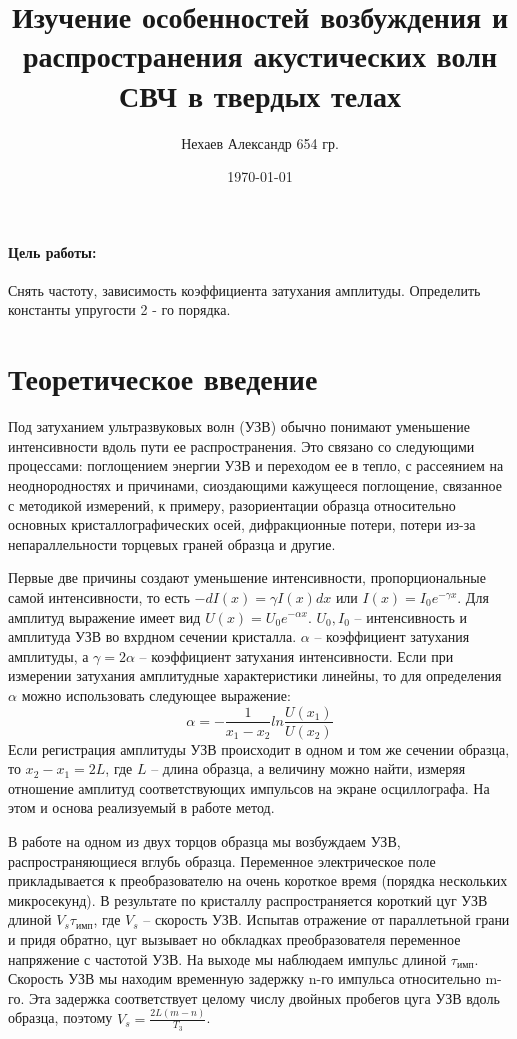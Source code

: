 \documentclass[a4paper, 12pt]{article}
\begin{document}
	\title{Изучение особенностей возбуждения и распространения акустических волн СВЧ в твердых телах}
	\author{Нехаев Александр 654 гр.}
	\date{\today}
	\maketitle
	\paragraph{Цель работы:}
	Снять частоту, зависимость коэффициента затухания амплитуды. Определить константы упругости 2 - го порядка.
	\section{Теоретическое введение}
	Под затуханием ультразвуковых волн (УЗВ) обычно понимают уменьшение интенсивности вдоль пути ее распространения. Это связано со следующими процессами: поглощением энергии УЗВ и переходом ее в тепло, с рассеянием на неоднородностях и причинами, сиоздающими кажущееся поглощение, связанное с методикой измерений, к примеру, разориентации образца относительно основных кристаллографических осей, дифракционные потери, потери из-за непараллельности торцевых граней образца и другие.

Первые две причины создают уменьшение интенсивности, пропорциональные самой интенсивности, то есть $-dI(x)=\gamma I(x)dx$ или $I(x)=I_{0}e^{-\gamma x}$. Для амплитуд выражение имеет вид $U(x)=U_{0}e^{-\alpha x}$. $U_{0}, I_{0}$ – интенсивность и амплитуда УЗВ во вхрдном сечении кристалла. $\alpha$ – коэффициент затухания амплитуды, а $\gamma=2\alpha$ – коэффициент затухания интенсивности. Если при измерении затухания амплитудные характеристики линейны, то для определения $\alpha$ можно использовать следующее выражение:
\begin{equation*}
\alpha=-\frac{1}{x_{1}-x_{2}}ln\frac{U(x_{1})}{U(x_{2})}
\end{equation*}
Если регистрация амплитуды УЗВ происходит в одном и том же сечении образца, то $x_{2}-x_{1}=2L$, где $L$ – длина образца, а величину можно найти, измеряя отношение амплитуд соответствующих импульсов на экране осциллографа. На этом и основа реализуемый в работе метод.

В работе на одном из двух торцов образца мы возбуждаем УЗВ, распространяющиеся вглубь образца. Переменное электрическое поле прикладывается к преобразователю на очень короткое время (порядка нескольких микросекунд). В результате по кристаллу распространяется короткий цуг УЗВ длиной $V_{s}\tau_{\text{имп}}$, где $V_{s}$ – скорость УЗВ. Испытав отражение от параллетьной грани и придя обратно, цуг вызывает но обкладках преобразователя переменное напряжение с частотой УЗВ. На выходе мы наблюдаем импульс длиной $\tau_{\text{имп}}$. Скорость УЗВ мы находим временную задержку n-го импульса относительно m-го. Эта задержка соответствует целому числу двойных пробегов цуга УЗВ вдоль образца, поэтому $V_{s}=\frac{2L(m-n)}{T_{3}}$.
\end{document}
